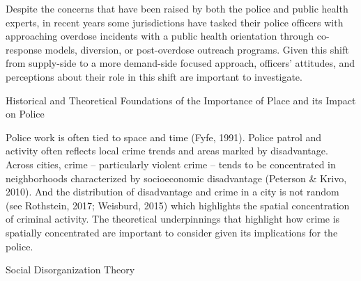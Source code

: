 Despite the concerns that have been raised by both the police and public health experts, in recent years some jurisdictions have tasked their police officers with approaching overdose incidents with a public health orientation through co-response models, diversion, or post-overdose outreach programs. Given this shift from supply-side to a more demand-side focused approach, officers’ attitudes, and perceptions about their role in this shift are important to investigate.

Historical and Theoretical Foundations of the Importance of Place and its Impact on Police

Police work is often tied to space and time (Fyfe, 1991). Police patrol and activity often reflects local crime trends and areas marked by disadvantage. Across cities, crime – particularly violent crime – tends to be concentrated in neighborhoods characterized by socioeconomic disadvantage (Peterson & Krivo, 2010). And the distribution of disadvantage and crime in a city is not random (see Rothstein, 2017; Weisburd, 2015) which highlights the spatial concentration of criminal activity. The theoretical underpinnings that highlight how crime is spatially concentrated are important to consider given its implications for the police.

Social Disorganization Theory

